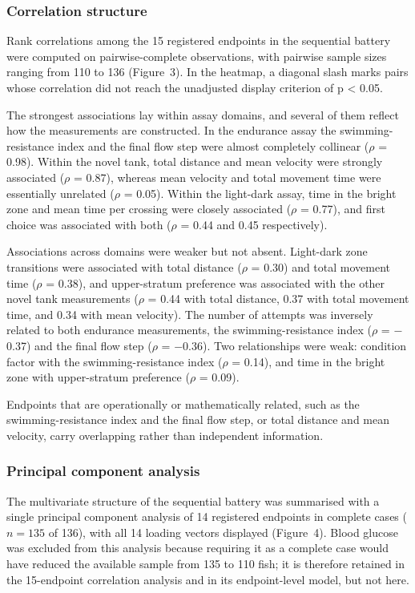\documentclass[12pt,a4paper]{article}
\begin{document}
\subsubsection{Correlation structure}
\label{sec:res-corr}

Rank correlations among the 15 registered endpoints in the sequential battery were computed on pairwise-complete observations, with pairwise sample sizes ranging from 110 to 136 (Figure~3). In the heatmap, a diagonal slash marks pairs whose correlation did not reach the unadjusted display criterion of p < 0.05.

The strongest associations lay within assay domains, and several of them reflect how the measurements are constructed. In the endurance assay the swimming-resistance index and the final flow step were almost completely collinear ($\rho$ = 0.98). Within the novel tank, total distance and mean velocity were strongly associated ($\rho$ = 0.87), whereas mean velocity and total movement time were essentially unrelated ($\rho$ = 0.05). Within the light-dark assay, time in the bright zone and mean time per crossing were closely associated ($\rho$ = 0.77), and first choice was associated with both ($\rho$ = 0.44 and 0.45 respectively).

Associations across domains were weaker but not absent. Light-dark zone transitions were associated with total distance ($\rho$ = 0.30) and total movement time ($\rho$ = 0.38), and upper-stratum preference was associated with the other novel tank measurements ($\rho$ = 0.44 with total distance, 0.37 with total movement time, and 0.34 with mean velocity). The number of attempts was inversely related to both endurance measurements, the swimming-resistance index ($\rho$ = $-$0.37) and the final flow step ($\rho$ = $-$0.36). Two relationships were weak: condition factor with the swimming-resistance index ($\rho$ = 0.14), and time in the bright zone with upper-stratum preference ($\rho$ = 0.09).

Endpoints that are operationally or mathematically related, such as the swimming-resistance index and the final flow step, or total distance and mean velocity, carry overlapping rather than independent information.

\subsubsection{Principal component analysis}
\label{sec-3-3-2}

The multivariate structure of the sequential battery was summarised with a single principal component analysis of 14 registered endpoints in complete cases ($n = 135$ of 136), with all 14 loading vectors displayed (Figure~4). Blood glucose was excluded from this analysis because requiring it as a complete case would have reduced the available sample from 135 to 110 fish; it is therefore retained in the 15-endpoint correlation analysis and in its endpoint-level model, but not here.
\end{document}

